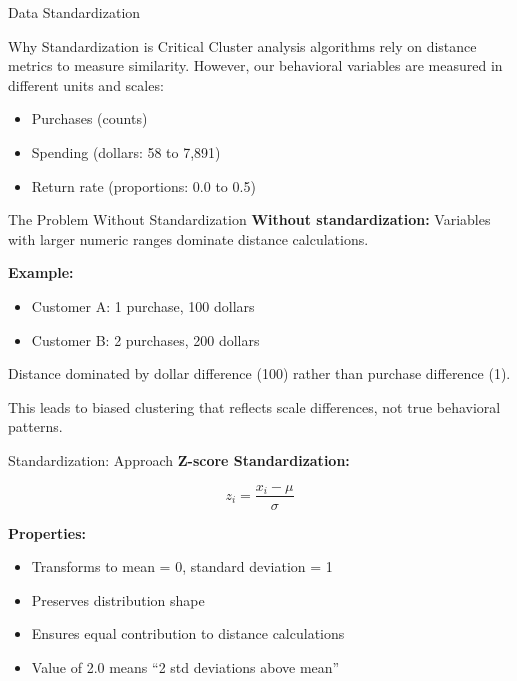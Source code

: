 \documentclass[aspectratio=169,ignorenonframetext]{beamer}
\begin{document}
\begin{frame}{Data Standardization}
\begin{block}{Why Standardization is Critical}
Cluster analysis algorithms rely on distance metrics to measure
similarity. However, our behavioral variables are measured in different
units and scales:

\begin{itemize}
\item
  Purchases (counts)
\item
  Spending (dollars: 58 to 7,891)
\item
  Return rate (proportions: 0.0 to 0.5)
\end{itemize}
\end{block}
\end{frame}

\begin{frame}{The Problem Without Standardization}
\textbf{Without standardization:} Variables with larger numeric ranges
dominate distance calculations.

\textbf{Example:}

\begin{itemize}
\item
  Customer A: 1 purchase, 100 dollars
\item
  Customer B: 2 purchases, 200 dollars
\end{itemize}

Distance dominated by dollar difference (100) rather than purchase
difference (1).

This leads to biased clustering that reflects scale differences, not
true behavioral patterns.
\end{frame}

\begin{frame}{Standardization: Approach}
\textbf{Z-score Standardization:}

\[z_{i} = \frac{x_{i} - \mu}{\sigma}\]

\textbf{Properties:}

\begin{itemize}
\item
  Transforms to mean = 0, standard deviation = 1
\item
  Preserves distribution shape
\item
  Ensures equal contribution to distance calculations
\item
  Value of 2.0 means ``2 std deviations above mean''
\end{itemize}
\end{frame}
\end{document}
